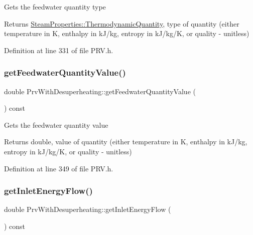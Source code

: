 Gets the feedwater quantity type

\begin{DoxyReturn}{Returns}
\hyperlink{class_steam_properties_ae0294bedf7d178c2d8fb6aed0f62fbff}{Steam\+Properties\+::\+Thermodynamic\+Quantity}, type of quantity (either temperature in K, enthalpy in k\+J/kg, entropy in k\+J/kg/K, or quality -\/ unitless) 
\end{DoxyReturn}


Definition at line 331 of file P\+R\+V.\+h.

\mbox{\label{class_prv_with_desuperheating_a8645a251b2e77e434a8bc51dfedcad69}} 
\subsubsection{\texorpdfstring{get\+Feedwater\+Quantity\+Value()}{getFeedwaterQuantityValue()}}
{\footnotesize\ttfamily double Prv\+With\+Desuperheating\+::get\+Feedwater\+Quantity\+Value (\begin{DoxyParamCaption}{ }\end{DoxyParamCaption}) const\hspace{0.3cm}{\ttfamily [inline]}}

Gets the feedwater quantity value

\begin{DoxyReturn}{Returns}
double, value of quantity (either temperature in K, enthalpy in k\+J/kg, entropy in k\+J/kg/K, or quality -\/ unitless) 
\end{DoxyReturn}


Definition at line 349 of file P\+R\+V.\+h.

\mbox{\label{class_prv_with_desuperheating_a97e33f978d78c0e26d6b38a02d4b122b}} 
\subsubsection{\texorpdfstring{get\+Inlet\+Energy\+Flow()}{getInletEnergyFlow()}}
{\footnotesize\ttfamily double Prv\+With\+Desuperheating\+::get\+Inlet\+Energy\+Flow (\begin{DoxyParamCaption}{ }\end{DoxyParamCaption}) const\hspace{0.3cm}{\ttfamily [inline]}}


